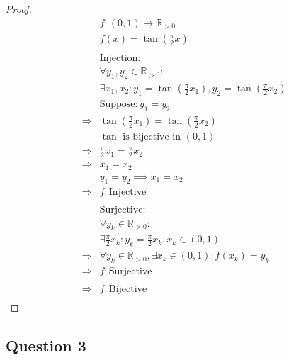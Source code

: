 \documentclass{article}
\begin{document}
\begin{proof}
    \begin{align*}
        &f:(0,1)\rightarrow\mathbb{R}_{>0}\\
        &f(x)=\tan(\frac{\pi}{2}x)\\
        &\\
        &\text{Injection}:\\
        &\forall y_1,y_2\in \mathbb{R}_{>0}:\\
        &\exists x_1,x_2:y_1=\tan(\frac{\pi}{2}x_1),y_2=\tan(\frac{\pi}{2}x_2)\\
        &\text{Suppose}: y_1=y_2\\
        \Rightarrow&\tan(\frac{\pi}{2}x_1)=\tan(\frac{\pi}{2}x_2)\\
        &\tan\text{ is bijective in }(0,1)\\
        \Rightarrow&\frac{\pi}{2}x_1=\frac{\pi}{2}x_2\\
        \Rightarrow&x_1=x_2\\
        &y_1=y_2\implies x_1=x_2\\
        \Rightarrow&f:\text{Injective}\\
        &\\
        &\text{Surjective}:\\
        &\forall y_k\in \mathbb{R}_{>0}:\\
        &\exists \frac{\pi}{2}x_k:y_k=\frac{\pi}{2}x_k,x_k\in(0,1)\\
        \Rightarrow&\forall y_k\in \mathbb{R}_{>0},\exists x_k\in (0,1):f(x_k)=y_k\\
        \Rightarrow&f:\text{Surjective}\\
        &\\
        \Rightarrow&f:\text{Bijective}\\
    \end{align*}
\end{proof}

\newpage

\subsection*{Question 3}

~
\end{document}
